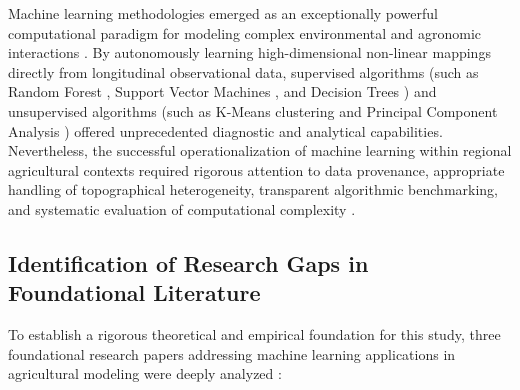 \documentclass[conference]{IEEEtran}
\begin{document}
Machine learning methodologies emerged as an exceptionally powerful computational paradigm for modeling complex environmental and agronomic interactions \cite{dhakal2023, breiman2001, cortes1995}. By autonomously learning high-dimensional non-linear mappings directly from longitudinal observational data, supervised algorithms (such as Random Forest \cite{breiman2001}, Support Vector Machines \cite{cortes1995}, and Decision Trees \cite{quinlan1986}) and unsupervised algorithms (such as K-Means clustering \cite{macqueen1967} and Principal Component Analysis \cite{hotelling1933}) offered unprecedented diagnostic and analytical capabilities. Nevertheless, the successful operationalization of machine learning within regional agricultural contexts required rigorous attention to data provenance, appropriate handling of topographical heterogeneity, transparent algorithmic benchmarking, and systematic evaluation of computational complexity \cite{hastie2009}.

\subsection{Identification of Research Gaps in Foundational Literature}
To establish a rigorous theoretical and empirical foundation for this study, three foundational research papers addressing machine learning applications in agricultural modeling were deeply analyzed \cite{dhakal2023, crane2018, fernandez2021}:
\end{document}
